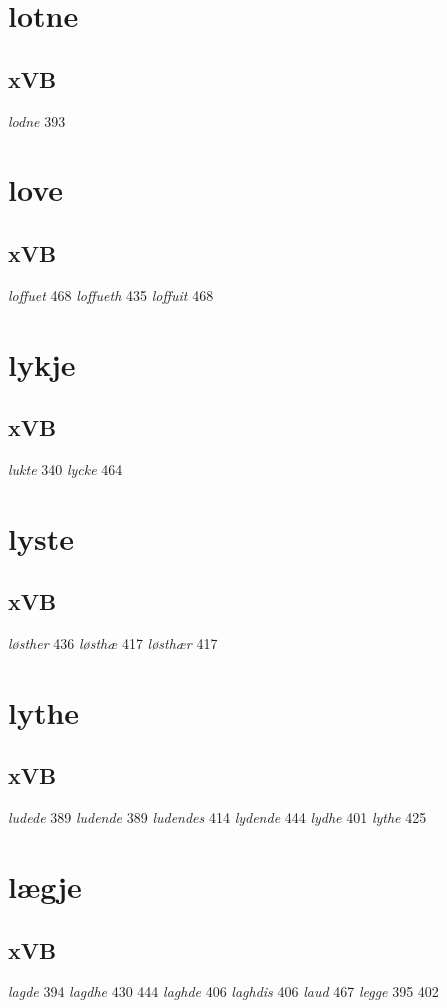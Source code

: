 \documentclass[a4paper,twocolumn]{article}
\begin{document}
\section{lotne}
\label{sec:org60463d9}
\subsection{xVB}
\label{sec:org0764fa1}
\emph{lodne} 393 
\section{love}
\label{sec:orgfa9745e}
\subsection{xVB}
\label{sec:org93d3750}
\emph{loffuet} 468 \emph{loffueth} 435 \emph{loffuit} 468 
\section{lykje}
\label{sec:org8a255e6}
\subsection{xVB}
\label{sec:org3b6d9d4}
\emph{lukte} 340 \emph{lycke} 464 
\section{lyste}
\label{sec:orge5beab8}
\subsection{xVB}
\label{sec:orgc2e12d9}
\emph{løsther} 436 \emph{løsthæ} 417 \emph{løsthær} 417 
\section{lythe}
\label{sec:org0fcd90b}
\subsection{xVB}
\label{sec:org4799673}
\emph{ludede} 389 \emph{ludende} 389 \emph{ludendes} 414 \emph{lydende} 444 \emph{lydhe} 401 \emph{lythe} 425 
\section{lægje}
\label{sec:org347576d}
\subsection{xVB}
\label{sec:org2c756f0}
\emph{lagde} 394 \emph{lagdhe} 430 444 \emph{laghde} 406 \emph{laghdis} 406 \emph{laud} 467 \emph{legge} 395 402 
\end{document}
